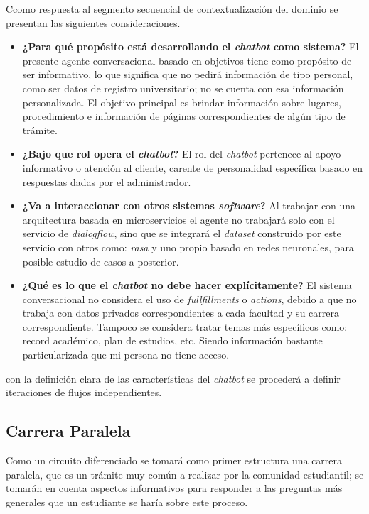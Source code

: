 \documentclass[letter, openright, 12pt]{book}
\begin{document}
\par Ccomo respuesta al segmento secuencial de contextualización del dominio se presentan las siguientes consideraciones.
{\begin{itemize}
\item {\textbf{¿Para qué propósito está desarrollando el {\it chatbot} como sistema?} El presente agente conversacional basado en objetivos tiene como propósito de ser informativo, lo que significa que no pedirá información de tipo personal, como ser datos de registro universitario; no se cuenta con esa información personalizada. El objetivo principal es brindar información sobre lugares, procedimiento e información de páginas correspondientes de algún tipo de trámite. } 

\item {\textbf{¿Bajo que rol opera el {\it chatbot}?} El rol del {\it chatbot} pertenece al apoyo informativo o atención al cliente, carente de personalidad específica basado en respuestas dadas por el administrador. }
 
\item {\textbf{¿Va a interaccionar con otros sistemas {\it software}?} Al trabajar con una arquitectura basada en microservicios el agente no trabajará solo con el servicio de {\it dialogflow}, sino que se integrará el {\it dataset} construido por este servicio con otros como: {\it rasa} y uno propio basado en redes neuronales, para posible estudio de casos a posterior.}
 
\item {\textbf{¿Qué es lo que el {\it chatbot} no debe hacer explícitamente?} El sistema conversacional no considera el uso de {\it fullfillments} o {\it actions}, debido a que no trabaja con datos privados correspondientes a cada facultad y su carrera correspondiente. Tampoco se considera tratar temas más específicos como: record académico, plan de estudios, etc. Siendo información bastante particularizada que mi persona no tiene acceso. } 

\end{itemize}

\par
con la definición clara de las características del {\it chatbot} se procederá a definir iteraciones de flujos independientes. 

\subsection{Carrera Paralela}
Como un circuito diferenciado se tomará como primer estructura una carrera paralela, que es un trámite muy común a realizar por la comunidad estudiantil; se tomarán en cuenta aspectos informativos para responder a las preguntas más generales que un estudiante se haría sobre este proceso. 

}
\end{document}

